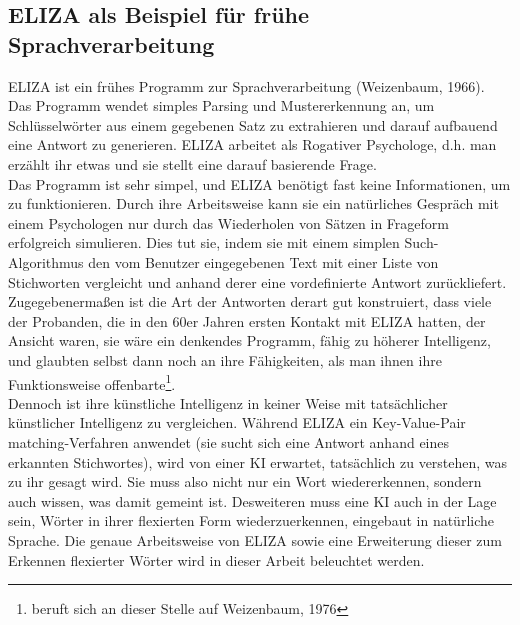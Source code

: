 \documentclass[12pt,twoside]{article}
\theoremstyle{plain}
\theoremstyle{definition}
\theoremstyle{remark}
\begin{document}
	\subsection{ELIZA als Beispiel für frühe Sprachverarbeitung}
	\label{ssec:eliza}
	ELIZA ist ein frühes Programm zur Sprachverarbeitung (Weizenbaum, 1966).
	Das Programm wendet simples Parsing und Mustererkennung an, um Schlüsselwörter aus einem gegebenen Satz zu extrahieren und darauf aufbauend eine Antwort zu generieren.
	ELIZA arbeitet als Rogativer Psychologe, d.h. man erzählt ihr etwas und sie stellt eine darauf basierende Frage.\\
	Das Programm ist sehr simpel, und ELIZA benötigt fast keine Informationen, um zu funktionieren.
	Durch ihre Arbeitsweise kann sie ein natürliches Gespräch mit einem Psychologen nur durch das Wiederholen von Sätzen in Frageform erfolgreich simulieren.
	Dies tut sie, indem sie mit einem simplen Such-Algorithmus den vom Benutzer eingegebenen Text mit einer Liste von Stichworten vergleicht und anhand derer eine vordefinierte Antwort zurückliefert.
	Zugegebenermaßen ist die Art der Antworten derart gut konstruiert, dass viele der Probanden, die in den 60er Jahren ersten Kontakt mit ELIZA hatten, der Ansicht waren, sie wäre ein denkendes Programm, fähig zu höherer Intelligenz, und glaubten selbst dann noch an ihre Fähigkeiten, als man ihnen ihre Funktionsweise offenbarte\footnote{\cite{Jur2009} beruft sich an dieser Stelle auf Weizenbaum, 1976}.\\
	Dennoch ist ihre künstliche Intelligenz in keiner Weise mit tatsächlicher künstlicher Intelligenz zu vergleichen.
	Während ELIZA ein Key-Value-Pair matching-Verfahren anwendet (sie sucht sich eine Antwort anhand eines erkannten Stichwortes), wird von einer KI erwartet, tatsächlich zu verstehen, was zu ihr gesagt wird.
	Sie muss also nicht nur ein Wort wiedererkennen, sondern auch wissen, was damit gemeint ist.
	Desweiteren muss eine KI auch in der Lage sein, Wörter in ihrer flexierten Form wiederzuerkennen, eingebaut in natürliche Sprache.
	Die genaue Arbeitsweise von ELIZA sowie eine Erweiterung dieser zum Erkennen flexierter Wörter wird in dieser Arbeit beleuchtet werden.
\end{document}
